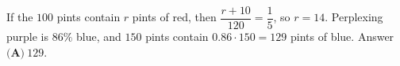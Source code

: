 If the $100$ pints contain $r$ pints of red, then $\dfrac{r+10}{120}=\dfrac15$, so $r=14$. Perplexing purple is $86\%$ blue, and $150$ pints contain $0.86\cdot150=129$ pints of blue. Answer $\boxed{\textbf{(A)}\ 129}$.
